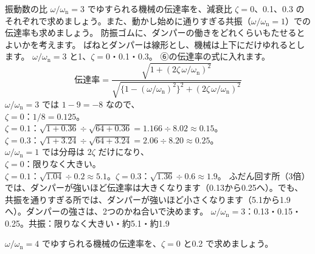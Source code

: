 \label{ph:波-2:ex5}
\begin{phreidai}[ダンパーは防振の味方か]
振動数の比 $\omega/\omega_{\mathrm n}=3$ でゆすられる機械の伝達率を、減衰比 $\zeta=0$、0.1、0.3 のそれぞれで求めましょう。また、動かし始めに通りすぎる共振（$\omega/\omega_{\mathrm n}=1$）での伝達率も求めましょう。
\phbamen
防振ゴムに、ダンパーの働きをどれくらいもたせるとよいかを考えます。
\phmushi
ばねとダンパーは線形とし、機械は上下にだけゆれるとします。
\phzu
$\omega/\omega_{\mathrm n}=3$ と1、$\zeta=0$・0.1・0.3。
\phriyu
⑥の伝達率の式に入れます。
\phtateru
\[\text{伝達率}=\frac{\sqrt{1+(2\zeta\,\omega/\omega_{\mathrm n})^2}}{\sqrt{\{1-(\omega/\omega_{\mathrm n})^2\}^2+(2\zeta\,\omega/\omega_{\mathrm n})^2}}\]
\phtoku
$\omega/\omega_{\mathrm n}=3$ では $1-9=-8$ なので、\\
$\zeta=0$：$1/8=0.125$。\\
$\zeta=0.1$：$\sqrt{1+0.36}\div\sqrt{64+0.36}=1.166\div8.02\approx0.15$。\\
$\zeta=0.3$：$\sqrt{1+3.24}\div\sqrt{64+3.24}=2.06\div8.20\approx0.25$。\\
$\omega/\omega_{\mathrm n}=1$ では分母は $2\zeta$ だけになり、\\
$\zeta=0$：限りなく大きい。\\
$\zeta=0.1$：$\sqrt{1.04}\div0.2\approx5.1$。\quad $\zeta=0.3$：$\sqrt{1.36}\div0.6\approx1.9$。
\phtashikame
ふだん回す所（3倍）では、ダンパーが強いほど伝達率は大きくなります（0.13から0.25へ）。でも、共振を通りすぎる所では、ダンパーが強いほど小さくなります（5.1から1.9へ）。ダンパーの強さは、2つのかね合いで決めます。
\kotae $\omega/\omega_{\mathrm n}=3$：0.13・0.15・0.25。共振：限りなく大きい・約5.1・約1.9
\end{phreidai}
\begin{jibun}
$\omega/\omega_{\mathrm n}=4$ でゆすられる機械の伝達率を、$\zeta=0$ と0.2 で求めましょう。
\end{jibun}


